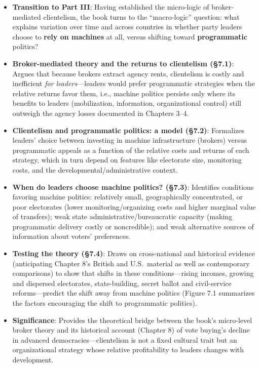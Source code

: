\documentclass[12pt]{article}
\begin{document}
\begin{itemize}[leftmargin=*, itemsep=4pt]
    \item \textbf{Transition to Part III}: Having established the micro-logic of broker-mediated clientelism, the book turns to the ``macro-logic'' question: what explains variation over time and across countries in whether party leaders choose to \textbf{rely on machines} at all, versus shifting toward \textbf{programmatic} politics?
    \item \textbf{Broker-mediated theory and the returns to clientelism (\S7.1)}: Argues that because brokers extract agency rents, clientelism is costly and inefficient \emph{for leaders}---leaders would prefer programmatic strategies when the relative returns favor them, i.e., machine politics persists only where its benefits to leaders (mobilization, information, organizational control) still outweigh the agency losses documented in Chapters 3--4.
    \item \textbf{Clientelism and programmatic politics: a model (\S7.2)}: Formalizes leaders' choice between investing in machine infrastructure (brokers) versus programmatic appeals as a function of the relative costs and returns of each strategy, which in turn depend on features like electorate size, monitoring costs, and the developmental/administrative context.
    \item \textbf{When do leaders choose machine politics? (\S7.3)}: Identifies conditions favoring machine politics: relatively small, geographically concentrated, or poor electorates (lower monitoring/organizing costs and higher marginal value of transfers); weak state administrative/bureaucratic capacity (making programmatic delivery costly or noncredible); and weak alternative sources of information about voters' preferences.
    \item \textbf{Testing the theory (\S7.4)}: Draws on cross-national and historical evidence (anticipating Chapter 8's British and U.S.\ material as well as contemporary comparisons) to show that shifts in these conditions---rising incomes, growing and dispersed electorates, state-building, secret ballot and civil-service reforms---predict the shift away from machine politics (Figure 7.1 summarizes the factors encouraging the shift to programmatic politics).
    \item \textbf{Significance}: Provides the theoretical bridge between the book's micro-level broker theory and its historical account (Chapter 8) of vote buying's decline in advanced democracies---clientelism is not a fixed cultural trait but an organizational strategy whose relative profitability to leaders changes with development.
\end{itemize}
\end{document}
